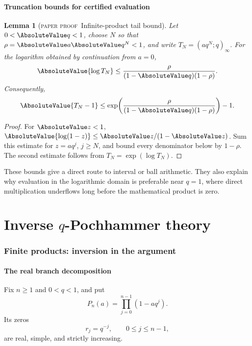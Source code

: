 \documentclass[11pt,oneside]{article}
\newtheorem{lemma}[theorem]{Lemma}
\theoremstyle{definition}
\theoremstyle{remark}
\theoremstyle{plain}
\theoremstyle{definition}
\theoremstyle{remark}
\newcommand{\statusproved}{\textcolor{provedgreen}{\textsc{paper proof}}}
\numberwithin{equation}{section}
\numberwithin{figure}{section}
\numberwithin{table}{section}
\let\reporttopsection\section
\let\reportsubsection\subsection
\let\reportsubsubsection\subsubsection
\let\chapter\reporttopsection
\let\section\reportsubsection
\let\subsection\reportsubsubsection
\begin{document}
\section{Truncation bounds for certified evaluation}
\begin{lemma}[\statusproved\ Infinite-product tail bound]\label{thm:product-tail}
Let \(0<\AbsoluteValue q<1\), choose \(N\) so that
\(\rho=\AbsoluteValue a\AbsoluteValue q^N<1\), and write
\(T_N=(aq^N;q)_\infty\).  For the logarithm obtained by continuation from
\(a=0\),
\[
 \AbsoluteValue{\log T_N}
 \le \frac{\rho}{(1-\AbsoluteValue q)(1-\rho)}.
\]
Consequently,
\[
 \AbsoluteValue{T_N-1}
 \le \exp\!\left(\frac{\rho}{(1-\AbsoluteValue q)(1-\rho)}\right)-1.
\]
\end{lemma}
\begin{proof}
For \(\AbsoluteValue z<1\), \(\AbsoluteValue{\log(1-z)}\le\AbsoluteValue z/(1-\AbsoluteValue z)\).  Sum this estimate
for \(z=aq^j\), \(j\ge N\), and bound every denominator below by
\(1-\rho\).  The second estimate follows from \(T_N=\exp(\log T_N)\).
\end{proof}

These bounds give a direct route to interval or ball arithmetic.  They also
explain why evaluation in the logarithmic domain is preferable near \(q=1\),
where direct multiplication underflows long before the mathematical product is
zero.

\part{Inverse \texorpdfstring{\(q\)}{q}-Pochhammer theory}

\chapter{Finite products: inversion in the argument}

\section{The real branch decomposition}
Fix \(n\ge1\) and \(0<q<1\), and put
\[
 P_n(a)=\prod_{j=0}^{n-1}(1-aq^j).
\]
Its zeros
\[
 r_j=q^{-j},\qquad 0\le j\le n-1,
\]
are real, simple, and strictly increasing.
\end{document}

